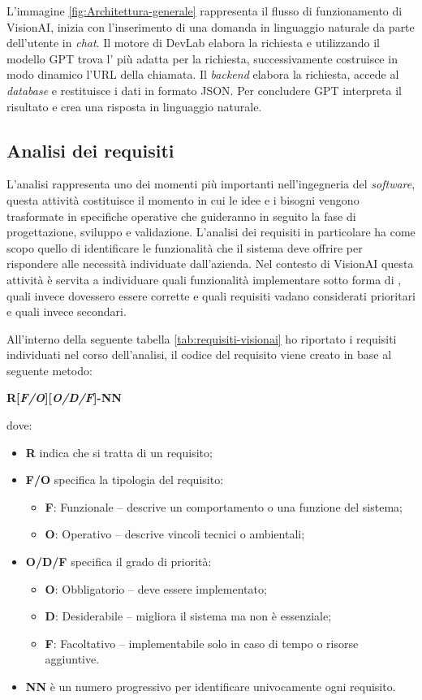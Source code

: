 L'immagine \ref{fig:Architettura-generale} rappresenta il flusso di funzionamento di VisionAI, inizia con l'inserimento di una domanda in linguaggio naturale da parte dell'utente in \textit{chat}. Il motore di DevLab elabora la richiesta e utilizzando il modello GPT trova l' più adatta per la richiesta,  successivamente costruisce in modo dinamico l'URL della chiamata. Il \textit{backend} elabora la richiesta, accede al \textit{database} e restituisce i dati in formato JSON. Per concludere GPT interpreta il risultato e crea una risposta in linguaggio naturale.


\subsection{Analisi dei requisiti}
L'analisi rappresenta uno dei momenti più importanti nell'ingegneria del \textit{software}, questa attività costituisce il momento in cui le idee e i bisogni vengono trasformate in specifiche operative che guideranno in seguito la fase di progettazione, sviluppo e validazione. 
L'analisi dei requisiti in particolare ha come scopo quello di identificare le funzionalità che il sistema deve offrire per rispondere alle necessità individuate dall'azienda.
Nel contesto di VisionAI questa attività è servita a individuare quali funzionalità implementare sotto forma di  , quali invece dovessero essere corrette e quali requisiti vadano considerati prioritari e quali invece secondari.

All'interno della seguente tabella \ref{tab:requisiti-visionai} ho riportato i requisiti individuati nel corso dell'analisi, il codice del requisito viene creato in base al seguente metodo:
\begin{center}
\textbf{R[\textit{F/O}][\textit{O/D/F}]-NN}
\end{center}

dove:
\begin{itemize}
  \item \textbf{R} indica che si tratta di un requisito;
  \item \textbf{F/O} specifica la tipologia del requisito:
    \begin{itemize}
      \item \textbf{F}: Funzionale – descrive un comportamento o una funzione del sistema;
      \item \textbf{O}: Operativo – descrive vincoli tecnici o ambientali;
    \end{itemize}
  \item \textbf{O/D/F} specifica il grado di priorità:
    \begin{itemize}
      \item \textbf{O}: Obbligatorio – deve essere implementato;
      \item \textbf{D}: Desiderabile – migliora il sistema ma non è essenziale;
      \item \textbf{F}: Facoltativo – implementabile solo in caso di tempo o risorse aggiuntive.
    \end{itemize}
  \item \textbf{NN} è un numero progressivo per identificare univocamente ogni requisito.
\end{itemize}


